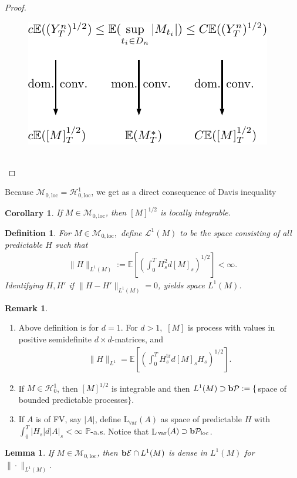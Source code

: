 \documentclass[12pt,a4paper, twoside]{article}
\newtheorem{lem}{Lemma}[section]
\newtheorem{cor}{Corollary}[section]
\newtheorem{defn}{Definition}[section]
\theoremstyle{definition}
\newtheorem{rem}{Remark}[section]
\newcommand{\EE}{\mathbb{E}} %
\newcommand{\PP}{\mathbb{P}} %
\newcommand{\simple}{\textbf{\text{b}}\mathcal{E}}
\newcommand{\pred}{\textbf{\text{b}}\mathcal{P}}
\begin{document}
\begin{proof}
\begin{figure}[hbtp]
\centering
\includegraphics[scale=1.2]{conv.pdf}
\end{figure}
\\
\end{proof}
\noindent Because $\mathcal{M}_{0, \text{loc}} = \mathcal{H}_{0, \text{loc}}^1$, we get as a direct consequence of Davis inequality
\begin{cor}\label{C38} If $M \in \mathcal{M}_{0, \text{loc}}$, then $[M]^{1/2}$ is locally integrable. 
\end{cor}
\newpage
\begin{defn} For $M \in \mathcal{M}_{0,\text{loc}},$ define $ \mathcal{L}^1(M)$ to be the space consisting of all predictable $H$ such that
\begin{align*}
\|H\|_{L^1(M)} := \EE \left[ \left( \int_0^T H_s^2 d[M]_s \right)^{1/2} \right] < \infty.
\end{align*}
Identifying $H, H'$ if $\|H-H'\|_{L^1(M)} =0$, yields space $L^1(M)$.  
\end{defn}
\begin{rem} \
\begin{enumerate}
\item Above definition is for $d=1$. For $d>1,$ $[M]$ is process with values in positive semidefinite $d\times d$-matrices, and 
\begin{align*}
\|H\|_{L^1 } = \EE \left[ \left( \int_0^T H_s^\text{tr} d[M]_sH_s \right)^{1/2} \right]. 
\end{align*}
\item If $M \in \mathcal{H}_0^1$, then $[M]^{1/2}$ is integrable and then $L^1 (M) \supset \pred:= \{$space of bounded predictable processes$\}$.
\item If $A$ is of FV, say $|A|$, define L$_\text{var}(A)$ as space of predictable $H$ with $\int_0^T |H_s| d |A|_s < \infty $ $\PP$-a.s. Notice that L$_\text{var}(A) \supset \pred_\text{loc}$. 
\end{enumerate}
\end{rem}
\begin{lem} \label{L39} If $M \in \mathcal{M}_{0, \text{loc}}$, then $\simple \cap L^1(M)$ is dense in $L^1(M)$ for $\| \cdot \|_{L^1(M)}. $
\end{lem}
\end{document}
